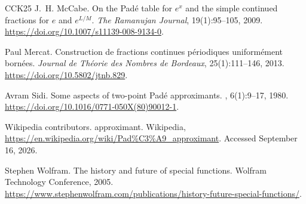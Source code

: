 \documentclass{article}
\numberwithin{equation}{section}
\theoremstyle{definition}
\theoremstyle{remark}
\newcommand{\<}{\left\langle}
\renewcommand{\>}{\right\rangle}
\begin{document}
\begin{thebibliography}{CCK{\etalchar{+}}25}
  J.~H. McCabe.
  \newblock On the Pad{\'e} table for $e^x$ and the simple continued fractions
  for $e$ and $e^{L/M}$.
  \newblock \emph{The Ramanujan Journal}, 19(1):95--105, 2009.
  \newblock \url{https://doi.org/10.1007/s11139-008-9134-0}.

  Paul Mercat.
  \newblock Construction de fractions continues p\'eriodiques uniform\'ement born\'ees.
  \newblock \emph{Journal de Th\'eorie des Nombres de Bordeaux}, 25(1):111--146, 2013.
  \newblock \url{https://doi.org/10.5802/jtnb.829}.

  Avram Sidi.
  \newblock Some aspects of two-point {Pad\'e} approximants.
  , 6(1):9--17,
  1980.
  \newblock \url{https://doi.org/10.1016/0771-050X(80)90012-1}.

  {Wikipedia contributors}.
   approximant.
  \newblock Wikipedia,
  \url{https://en.wikipedia.org/wiki/Pad\%C3\%A9_approximant}.
  \newblock Accessed September 16, 2026.

  Stephen Wolfram.
  \newblock The history and future of special functions.
  \newblock Wolfram Technology Conference, 2005.
  \newblock \url{https://www.stephenwolfram.com/publications/history-future-special-functions/}.
\end{thebibliography}
\end{document}
